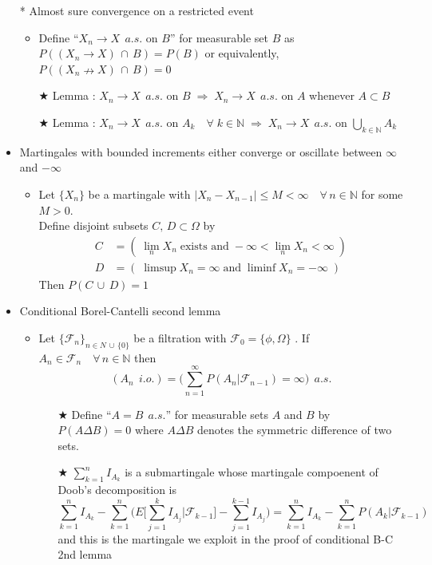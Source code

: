 \documentclass[12pt, A4]{article}
\newcommand{\trick}{$\bigstar$}
\newcommand{\N}{\mathbb{N}}
\newcommand{\F}{\mathcal{F}}
\newcommand{\union}{\,\cup\,}
\newcommand{\intersect}{\,\cap\,}
\newcommand{\foranyn}{\quad \forall \, n\in \N}
\begin{document}
\begin{itemize}
\begin{itemize}
	\end{itemize}
	\item[*] Almost sure convergence on a restricted event
	\begin{itemize}
		\item Define ``$X_n\rightarrow X\;\,a.s.$ on $B$'' for measurable set $B$ as \\$P((X_n\rightarrow X)\intersect B)=P(B)$ or equivalently, $P((X_n\nrightarrow X)\intersect B)=0$
		\item[\trick] Lemma : $X_n\rightarrow X\;\,a.s.$ on $B\;\Rightarrow\; X_n\rightarrow X\;\,a.s.$ on $A$ whenever $A\subset B$ 
		\item[\trick] Lemma : $X_n\rightarrow X\;\,a.s.$ on $A_k \quad \forall\; k\in \N\;\Rightarrow\; X_n\rightarrow X\;\,a.s.$ on $\bigcup_{k\in \N} A_k$
	\end{itemize}
	\item Martingales with bounded increments either converge or oscillate between $\infty$ and $-\infty$
	\begin{itemize}
		\item Let $\{X_n\}$ be a martingale with $|X_n-X_{n-1}|\leq M<\infty\foranyn$ for some $M>0$. \\Define disjoint subsets $C,\,D\subset \Omega$ by 
		\begin{align*}
			C&=(\;\lim_n X_n\; \text{exists and}\; -\infty<\lim_nX_n<\infty \;)\\
			D&=(\;\limsup X_n=\infty \;\text{and}\; \liminf X_n=-\infty \;)
		\end{align*}
		Then $P(C\union D)=1$
	\end{itemize}
	\item Conditional Borel-Cantelli second lemma
	\begin{itemize}
		\item Let $\{\F_n\}_{n\in N\union \{0\}}$ be a filtration with $\F_0=\{\phi, \Omega\}$ . If $A_n\in \F_n\foranyn$ then $$(A_n\;\,i.o.)=\Big(\sum_{n=1}^\infty P(A_n|\F_{n-1})=\infty\Big)\;\,a.s. $$
		\begin{itemize}
			\item[\trick] Define ``$A=B\;\,a.s.$'' for measurable sets $A$ and $B$ by $P(A\Delta B)=0$ where $A\Delta B$ denotes the symmetric difference of two sets.
			\item[\trick] $\sum_{k=1}^n I_{A_k}$ is a submartingale whose martingale compoenent of Doob's decomposition is $$\sum_{k=1}^n I_{A_k}-\sum_{k=1}^n\Big( E\Big[\sum_{j=1}^k I_{A_j}|\F_{k-1}\Big]-\sum_{j=1}^{k-1}I_{A_{j}}\Big)=\sum_{k=1}^n I_{A_k}-\sum_{k=1}^nP(A_k|\F_{k-1})$$ and this is the martingale we exploit in the proof of conditional B-C 2nd lemma 

\end{itemize}
\end{itemize}
\end{itemize}
\end{document}
